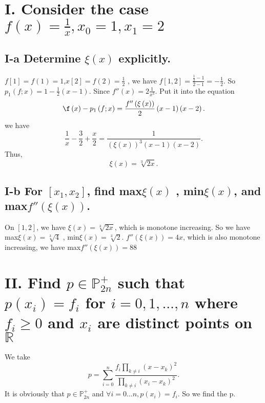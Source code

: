 \documentclass[twoside,a4paper]{article}
\begin{document}
\pagestyle{fancy}
\fancyhead{}


\section*{I. \small{Consider the case $f\left( x \right)=\frac{1}{x}
,x_0=1,x_1=2$}}

\subsection*{I-a \small{Determine $\xi\left( x \right) $ explicitly.}} 

$f[1]=f\left( 1 \right)=1 $,$x[2]=f\left( 2 \right)=\frac{1}{2} $
, we have $f[1, 2]=\frac{\frac{1}{2}-1}{2-1}=-\frac{1}{2}$.
So $p_{1}\left( f;x \right)=1-\frac{1}{2}\left( x-1 \right)$.
Since $f''\left( x \right)=2 \frac{1}{x^{3}} $. Put it into the equation 
\[
	\f\left( x \right)-p_{1}\left( f;x \right) 
	=\frac{f''\left( \xi\left( x \right)  \right) }{2}
	\left( x-1 \right)\left( x-2 \right)  
.\] 
we have
\[
	\frac{1}{x}-\frac{3}{2}+\frac{x}{2}
	=\frac{1}{\left(  \xi\left( x \right) \right)^{3} \left( x-1 \right)\left(  x-2\right)  }
.\] 
Thus,
\[
	\xi\left( x \right)=\sqrt[3]{2x}     
.\] 


\subsection*{I-b \small{For $[x_1, x_2]$, find max$\xi\left( x \right)$ 
, min$\xi\left( x \right) $, and max$f''\left( \xi\left( x \right)  \right) $.}}

On $[1, 2]$, we have $\xi\left( x \right)=\sqrt[3]{2x}$, which is monotone increasing. So we have max$\xi\left( x \right)=\sqrt[3]{4}  $ 
, min$\xi\left(  x\right)=\sqrt[3]{2}  $.
$f''\left(  \xi\left( x \right) \right) = 4x$, which is also monotone increasing, we have max$f''\left( \xi\left( x \right)  \right) =8 $8 

\section*{II. \small{Find $p\in\mathbb{P}_{2n}^{+}$ such that  $p\left( x_{i} \right)=f_{i} $ for $i=0,1,\ldots,n$ where $f_{i}\ge0$ 
and $x_{i}$ are distinct points on $\mathbb{R}$}}

We take 
\[
	p
	=\sum_{i=0}^{n}\frac{f_{i}\prod_{k\neq i}\left(  x-x_{k}\right)^{2}}{\prod_{k\neq i}{\left( x_{i}-x_{k} \right)^{2} }} 
.\] 
It is obviously that $p\in\mathbb{P}_{2n}^{+}$ and $\forall i=0\ldots n, p\left(  x_{i}\right)=f_{i} $. So we find the p.
\end{document}
